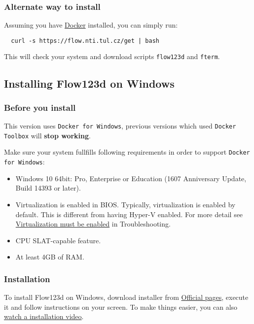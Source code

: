 \subsubsection{Alternate way to install}
Assuming you have \href{https://www.docker.com}{Docker} installed, you can simply run:
\begin{verbatim}
  curl -s https://flow.nti.tul.cz/get | bash
\end{verbatim}
This will check your system and download scripts \verb'flow123d' and \verb'fterm'.


\subsection{Installing Flow123d on Windows}
\subsubsection{Before you install}

This version uses \verb'Docker for Windows', previous versions which used \verb'Docker Toolbox' will \textbf{stop working}.

Make sure your system fullfills following requirements in order to support \verb'Docker for Windows':
\begin{itemize}
    \item Windows 10 64bit: Pro, Enterprise or Education (1607 Anniversary Update, Build 14393 or later).
    \item Virtualization is enabled in BIOS. Typically, virtualization is enabled by default. This is different from having Hyper-V enabled. For more detail see \href{https://docs.docker.com/docker-for-windows/troubleshoot/#virtualization-must-be-enabled}{Virtualization must be enabled} in Troubleshooting.
    \item CPU SLAT-capable feature.
    \item At least 4GB of RAM.
\end{itemize}


\subsubsection{Installation}

To install Flow123d on Windows, download installer from \href{http://flow123d.github.io/}{Official pages}, execute it and follow instructions
on your screen. To make things easier, you can also \href{https://www.youtube.com/watch?v=xDR2vU-1IhM}{watch a installation video}.

